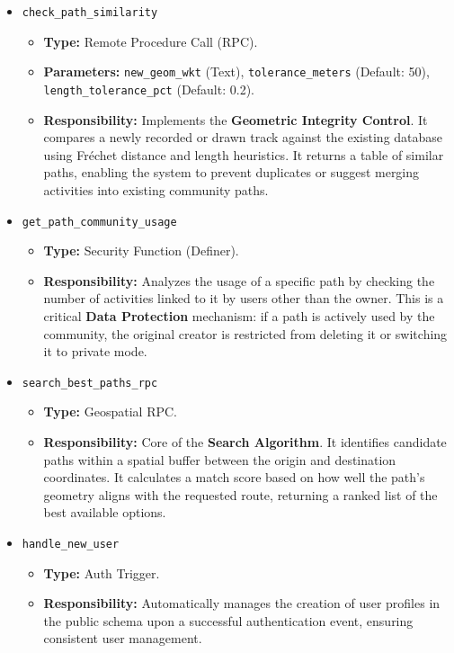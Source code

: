 \begin{itemize}
    \item \texttt{check\_path\_similarity}
    \begin{itemize}
        \item \textbf{Type:} Remote Procedure Call (RPC).
        \item \textbf{Parameters:} \texttt{new\_geom\_wkt} (Text), \texttt{tolerance\_meters} (Default: 50), \texttt{length\_tolerance\_pct} (Default: 0.2).
        \item \textbf{Responsibility:} Implements the \textbf{Geometric Integrity Control}. It compares a newly recorded or drawn track against the existing database using Fréchet distance and length heuristics. It returns a table of similar paths, enabling the system to prevent duplicates or suggest merging activities into existing community paths.
    \end{itemize}

    \item \texttt{get\_path\_community\_usage}
    \begin{itemize}
        \item \textbf{Type:} Security Function (Definer).
        \item \textbf{Responsibility:} Analyzes the usage of a specific path by checking the number of activities linked to it by users other than the owner. This is a critical \textbf{Data Protection} mechanism: if a path is actively used by the community, the original creator is restricted from deleting it or switching it to private mode.
    \end{itemize}

    \item \texttt{search\_best\_paths\_rpc}
    \begin{itemize}
        \item \textbf{Type:} Geospatial RPC.
        \item \textbf{Responsibility:} Core of the \textbf{Search Algorithm}. It identifies candidate paths within a spatial buffer between the origin and destination coordinates. It calculates a match score based on how well the path's geometry aligns with the requested route, returning a ranked list of the best available options.
    \end{itemize}

    \item \texttt{handle\_new\_user}
    \begin{itemize}
        \item \textbf{Type:} Auth Trigger.
        \item \textbf{Responsibility:} Automatically manages the creation of user profiles in the public schema upon a successful authentication event, ensuring consistent user management.
    \end{itemize}
\end{itemize}


